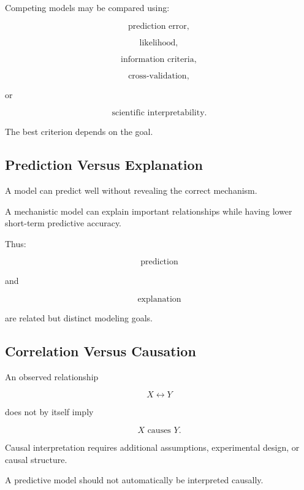 Competing models may be compared using:

\[
\boxed{
\text{prediction error},
}
\]

\[
\boxed{
\text{likelihood},
}
\]

\[
\boxed{
\text{information criteria},
}
\]

\[
\boxed{
\text{cross-validation},
}
\]

or

\[
\boxed{
\text{scientific interpretability}.
}
\]

The best criterion depends on the goal.

\subsection{Prediction Versus Explanation}
\label{subsec:model-prediction-explanation}

A model can predict well without revealing the correct mechanism.

A mechanistic model can explain important relationships while having lower
short-term predictive accuracy.

Thus:

\[
\boxed{
\text{prediction}
}
\]

and

\[
\boxed{
\text{explanation}
}
\]

are related but distinct modeling goals.

\subsection{Correlation Versus Causation}
\label{subsec:model-correlation-causation}

An observed relationship

\[
X\leftrightarrow Y
\]

does not by itself imply

\[
\boxed{
X
\text{ causes }
Y.
}
\]

Causal interpretation requires additional assumptions, experimental design,
or causal structure.

A predictive model should not automatically be interpreted causally.

